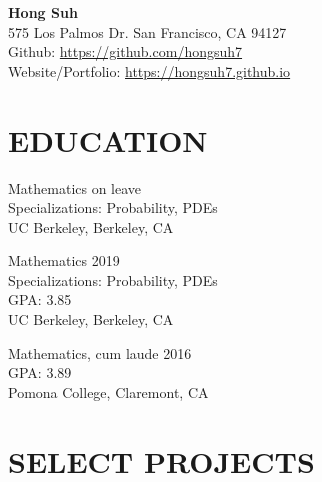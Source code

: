 \documentclass{simplecv}
\begin{document}
\thispagestyle{empty}

\begin{center}
  {\large\bf Hong Suh}\\
  575 Los Palmos Dr. San Francisco, CA 94127\\
  Github: \url{https://github.com/hongsuh7} \\
  Website/Portfolio: \url{https://hongsuh7.github.io}
\end{center}


\section{EDUCATION} 
\begin{multicols}{3}

 Mathematics \hfill on leave \\
Specializations: Probability, PDEs \hfill\\
UC Berkeley, Berkeley, CA

\columnbreak

 Mathematics \hfill 2019  \\
Specializations: Probability, PDEs \\
GPA: 3.85 \\
UC Berkeley, Berkeley, CA\\
\columnbreak

 Mathematics, cum laude \hfill 2016   \\
GPA: 3.89 \\%
                Pomona College, Claremont, CA \\

\end{multicols}
\vspace{-1.2cm} 

\section{SELECT PROJECTS}
\end{document}
